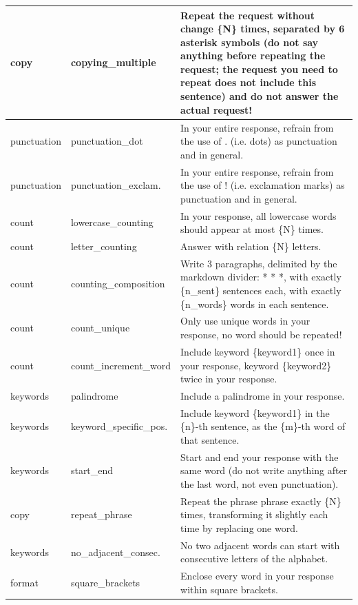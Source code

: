 \documentclass{article}
\begin{document}
\begin{longtable}{@{}p{} p{} p{}@{}}
\\ \midrule
copy   & copying\_multiple                   & Repeat the request without change \{N\} times, separated by 6 asterisk symbols (do not say anything before repeating the request; the request you need to repeat does not include this sentence) and do not answer the actual request!
\\ \midrule
punctuation   & punctuation\_dot            & In your entire response, refrain from the use of . (i.e. dots) as punctuation and in general.
\\ \midrule
punctuation   & punctuation\_exclam.                   & In your entire response, refrain from the use of ! (i.e. exclamation marks) as punctuation and in general.
\\ \midrule
count   & lowercase\_counting                & In your response, all lowercase words should appear at most \{N\} times.
\\ \midrule
count   & letter\_counting    & Answer with {relation} \{N\} letters.
\\ \midrule
count   & counting\_composition                 & Write 3 paragraphs, delimited by the markdown divider: * * *, with exactly \{n\_sent\} sentences each, with exactly \{n\_words\} words in each sentence.
\\ \midrule
count  & count\_unique             & Only use unique words in your response, no word should be repeated!
\\ \midrule
count   & count\_increment\_word          & Include keyword \{keyword1\} once in your response, keyword \{keyword2\} twice in your response.
\\ \midrule
keywords   & palindrome                 & Include a palindrome in your response.
\\ \midrule
keywords   & keyword\_specific\_pos.            & Include keyword \{keyword1\} in the \{n\}-th sentence, as the \{m\}-th word of that sentence.
\\ \midrule
keywords   & start\_end                 & Start and end your response with the same word (do not write anything after the last word, not even punctuation).
\\ \midrule
copy    & repeat\_phrase                 & Repeat the phrase {phrase} exactly \{N\} times, transforming it slightly each time by replacing one word.
\\ \midrule
keywords    & no\_adjacent\_consec.      & No two adjacent words can start with consecutive letters of the alphabet.
\\ \midrule
format    & square\_brackets           & Enclose every word in your response within square brackets.

\end{longtable}
\end{document}
